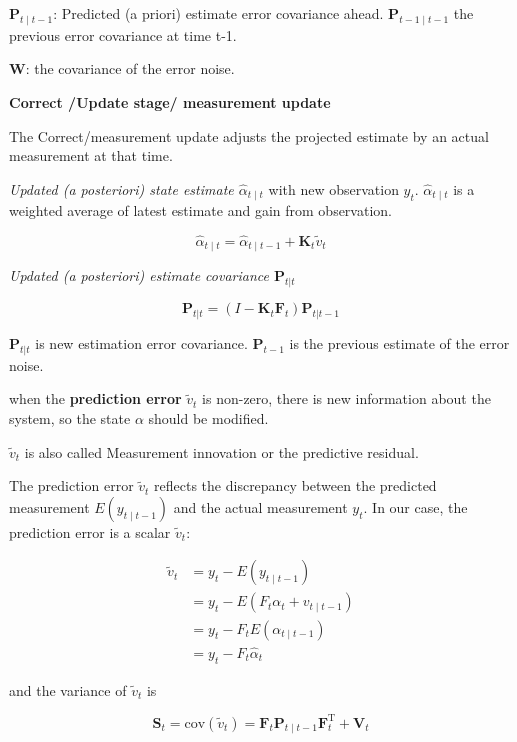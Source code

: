 $\mathbf{P}_{t\mid t-1}$: Predicted (a priori) estimate error covariance ahead. $\mathbf{P}_{t-1\mid t-1}$ the previous error covariance at time t-1.  

$\mathbf{W}$: the covariance of the error noise.








\textbf{Correct /Update stage/  measurement update}

The Correct/measurement update adjusts the projected estimate by an actual measurement at that time.


\textit{Updated (a posteriori) state estimate $\hat{\alpha}_{t\mid t}$} with new observation $y_t$. $\hat{\alpha}_{t\mid t}$ is a weighted average of latest estimate and gain from observation. 


$$\hat{\alpha}_{t\mid t} = \hat{\alpha}_{t\mid t-1} + \mathbf{K}_t \tilde{v}_t$$  


\textit{Updated (a posteriori) estimate covariance $\mathbf{P}_{t|t}$} 



$$\mathbf{P}_{t|t} = (I - \mathbf{K}_t \mathbf{F}_t) \mathbf{P}_{t|t-1}$$


$\mathbf{P}_{t|t}$ is new estimation error covariance. $\mathbf{P}_{t-1}$ is the previous estimate of the error noise. 


when the \textbf{prediction error}  $\tilde{v}_t$  is non-zero, there is new information about the system, so the state  $\alpha$ should be modified.


$\tilde{v}_t$ is also called Measurement innovation or the predictive residual.  

The prediction error $\tilde{v}_t$ reflects the discrepancy between the predicted measurement $E(y_{t\mid t-1})$ and the actual measurement $y_t$. In our case, the prediction error is a scalar $\tilde{v}_t$:

  
$$\begin{aligned}
\tilde v_t  &= y_t -E(y_{t\mid t-1} ) \\
& = y_t -E( F_{t}\alpha_{t}+v_{t\mid t-1} ) \\
& = y_t - F_{t} E(\alpha_{t\mid t-1} ) \\
& = y_t -F_{t} \hat \alpha_{t}
\end{aligned}$$

and the variance of $\tilde{v}_t$ is  

$$\mathbf{S}_{t} = \mathrm{cov}(\tilde{v}_t) 
 = \mathbf{F}_t \mathbf{P}_{t\mid t-1} \mathbf{F}_{t}^\text{T} + \mathbf{V}_t$$

